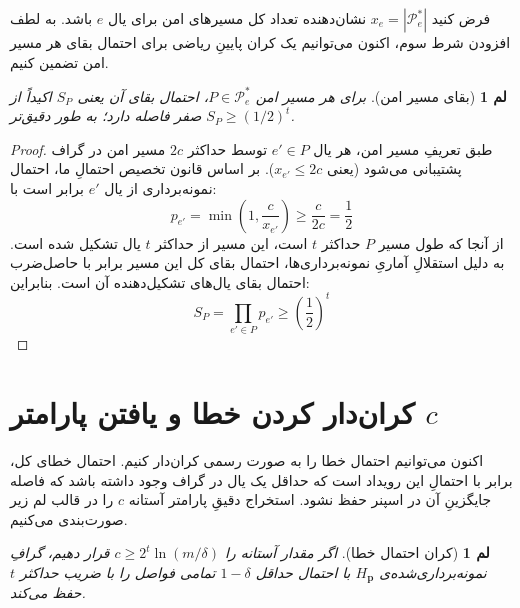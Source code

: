 \documentclass[11pt,a4paper]{report}
\theoremstyle{plain}
\newtheorem{lem}[thm]{\normalsize لم}
\theoremstyle{definition}
\theoremstyle{remark}
\begin{document}
فرض کنید $x_e = |\mathcal{P}^*_e|$ نشان‌دهنده تعداد کل مسیرهای امن برای یال $e$ باشد. به لطف افزودن شرط سوم، اکنون می‌توانیم یک کران پایینِ ریاضی برای احتمال بقای هر مسیر امن تضمین کنیم.

\begin{lem}[بقای مسیر امن]\label{lem:safe_path_survival}
برای هر مسیر امن $P \in \mathcal{P}^*_e$، احتمال بقای آن یعنی $S_P$ اکیداً از صفر فاصله دارد؛ به طور دقیق‌تر $S_P \ge (1/2)^t$.
\end{lem}

\begin{proof}
طبق تعریفِ مسیر امن، هر یال $e' \in P$ توسط حداکثر $2c$ مسیر امن در گراف پشتیبانی می‌شود (یعنی $x_{e'} \le 2c$). بر اساس قانون تخصیص احتمالِ ما، احتمال نمونه‌برداری از یال $e'$ برابر است با:
\[
p_{e'} = \min\left(1, \frac{c}{x_{e'}}\right) \ge \frac{c}{2c} = \frac{1}{2}
\]
از آنجا که طول مسیر $P$ حداکثر $t$ است، این مسیر از حداکثر $t$ یال تشکیل شده است. به دلیل استقلالِ آماریِ نمونه‌برداری‌ها، احتمال بقای کل این مسیر برابر با حاصل‌ضرب احتمال بقای یال‌های تشکیل‌دهنده آن است. بنابراین:
\[
S_P = \prod_{e' \in P} p_{e'} \ge \left(\frac{1}{2}\right)^t
\]
\end{proof}

\section{کران‌دار کردن خطا و یافتن پارامتر \texorpdfstring{$c$}{c}}
اکنون می‌توانیم احتمال خطا را به صورت رسمی کران‌دار کنیم. احتمال خطای کل، برابر با احتمالِ این رویداد است که حداقل یک یال در گراف وجود داشته باشد که فاصله جایگزینِ آن در اسپنر حفظ نشود. استخراج دقیقِ پارامتر آستانه $c$ را در قالب لم زیر صورت‌بندی می‌کنیم.

\begin{lem}[کران احتمال خطا]\label{lem:failure_bound}
اگر مقدار آستانه را $c \ge 2^t \ln(m/\delta)$ قرار دهیم، گرافِ نمونه‌برداری‌شده‌ی $H_{\mathbf p}$ با احتمال حداقل $1 - \delta$ تمامی فواصل را با ضریب حداکثر $t$ حفظ می‌کند.
\end{lem}
\end{document}
